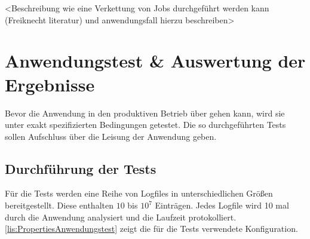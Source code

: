<Beschreibung wie eine Verkettung von Jobs durchgeführt werden kann (Freiknecht literatur) und anwendungsfall hierzu beschreiben>




\section{Anwendungstest \& Auswertung der Ergebnisse}
Bevor die Anwendung in den produktiven Betrieb über gehen kann, wird sie unter exakt spezifizierten Bedingungen getestet. Die so durchgeführten Tests sollen Aufschluss über die Leisung der Anwendung geben.

\subsection{Durchführung der Tests}
Für die Tests werden eine Reihe von Logfiles in unterschiedlichen Größen bereitgestellt. Diese enthalten $10$ bis $10^7$ Einträgen. Jedes Logfile wird 10 mal durch die Anwendung analysiert und die Laufzeit protokolliert. \autoref{lis:PropertiesAnwendungstest} zeigt die für die Tests verwendete Konfiguration. \\

